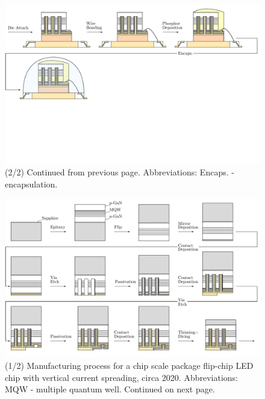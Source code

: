 \documentclass[10pt]{article}
\begin{document}
    \begin{landscape}
        \begin{figure}
            \includegraphics[width=595pt]{./figures/vtf_overview_2012-2.pdf}
            \caption{(2/2) Continued from previous page. Abbreviations: Encaps. - encapsulation.}
            \label{fig:manuf_vtf_2012-2}
        \end{figure}
    \end{landscape}


    \begin{landscape}
        \begin{figure}
            \includegraphics[width=595pt]{./figures/csp_overview_2020-1.pdf}
            \caption{(1/2) Manufacturing process for a chip scale package flip-chip LED chip with vertical current spreading, circa 2020. Abbreviations: MQW - multiple quantum well. Continued on next page.}
            \label{fig:manuf_csp_2020-1}
        \end{figure}
    \end{landscape}
\end{document}
